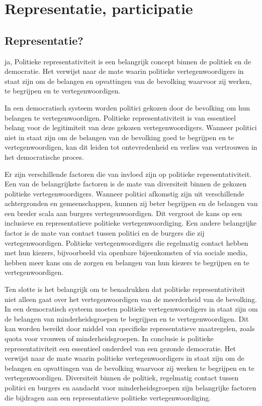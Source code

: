 \chapter{Representatie, participatie}

\section{Representatie?}
ja, Politieke representativiteit is een belangrijk concept binnen de politiek en de democratie. Het verwijst naar de mate waarin politieke vertegenwoordigers in staat zijn om de belangen en opvattingen van de bevolking waarvoor zij werken, te begrijpen en te vertegenwoordigen.

In een democratisch systeem worden politici gekozen door de bevolking om hun belangen te vertegenwoordigen. Politieke representativiteit is van essentieel belang voor de legitimiteit van deze gekozen vertegenwoordigers. Wanneer politici niet in staat zijn om de belangen van de bevolking goed te begrijpen en te vertegenwoordigen, kan dit leiden tot ontevredenheid en verlies van vertrouwen in het democratische proces.

Er zijn verschillende factoren die van invloed zijn op politieke representativiteit. Een van de belangrijkste factoren is de mate van diversiteit binnen de gekozen politieke vertegenwoordigers. Wanneer politici afkomstig zijn uit verschillende achtergronden en gemeenschappen, kunnen zij beter begrijpen en de belangen van een breder scala aan burgers vertegenwoordigen. Dit vergroot de kans op een inclusieve en representatieve politieke vertegenwoordiging.
Een andere belangrijke factor is de mate van contact tussen politici en de burgers die zij vertegenwoordigen. Politieke vertegenwoordigers die regelmatig contact hebben met hun kiezers, bijvoorbeeld via openbare bijeenkomsten of via sociale media, hebben meer kans om de zorgen en belangen van hun kiezers te begrijpen en te vertegenwoordigen.

Ten slotte is het belangrijk om te benadrukken dat politieke representativiteit niet alleen gaat over het vertegenwoordigen van de meerderheid van de bevolking. In een democratisch systeem moeten politieke vertegenwoordigers in staat zijn om de belangen van minderheidsgroepen te begrijpen en te vertegenwoordigen. Dit kan worden bereikt door middel van specifieke representatieve maatregelen, zoals quota voor vrouwen of minderheidsgroepen.
In conclusie is politieke representativiteit een essentieel onderdeel van een gezonde democratie. Het verwijst naar de mate waarin politieke vertegenwoordigers in staat zijn om de belangen en opvattingen van de bevolking waarvoor zij werken te begrijpen en te vertegenwoordigen. Diversiteit binnen de politiek, regelmatig contact tussen politici en burgers en aandacht voor minderheidsgroepen zijn belangrijke factoren die bijdragen aan een representatieve politieke vertegenwoordiging.

